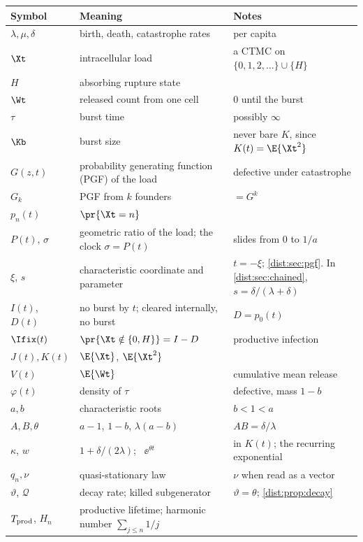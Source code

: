 \begin{table}[tbp]
\centering
\renewcommand{\arraystretch}{1.05}
\footnotesize
\begin{tabular}{@{}llp{}@{}}
\toprule
Symbol & Meaning & Notes \\
\midrule
$\lambda,\mu,\delta$ & birth, death, catastrophe rates & per capita \\
$\Xt$ & intracellular load & a CTMC on $\{0,1,2,\ldots\}\cup\{H\}$ \\
$H$ & absorbing rupture state & \\
$\Wt$ & released count from one cell & $0$ until the burst \\
$\tau$ & burst time & possibly $\infty$ \\
$\Kb$ & burst size & never bare $K$, since $K(t)=\E{\Xt^2}$ \\
$G(z,t)$ & probability generating function (PGF) of the load & defective under catastrophe \\
$G_k$ & PGF from $k$ founders & $=G^k$ \\
$p_n(t)$ & $\pr{\Xt=n}$ & \\
$P(t)$, $\sigma$ & geometric ratio of the load; the clock $\sigma=P(t)$ & slides from $0$ to $1/a$ \\
$\xi$, $s$ & characteristic coordinate and parameter & $t=-\xi$; \cref{dist:sec:pgf}. In \cref{dist:sec:chained}, $s=\delta/(\lambda+\delta)$ \\
$I(t)$, $D(t)$ & no burst by $t$; cleared internally, no burst & $D=p_0(t)$ \\
$\Ifix(t)$ & $\pr{\Xt\notin\{0,H\}}=I-D$ & productive infection \\
$J(t),K(t)$ & $\E{\Xt}$, $\E{\Xt^2}$ & \\
$V(t)$ & $\E{\Wt}$ & cumulative mean release \\
$\varphi(t)$ & density of $\tau$ & defective, mass $1-b$ \\
$a,b$ & characteristic roots & $b<1<a$ \\
$A,B,\theta$ & $a-1$, $1-b$, $\lambda(a-b)$ & $AB=\delta/\lambda$ \\
$\kappa$, $w$ & $1+\delta/(2\lambda)$; \ $\ee^{\theta t}$ & in $K(t)$; the recurring exponential \\
$q_n,\nu$ & quasi-stationary law & $\nu$ when read as a vector \\
$\vartheta$, $\mathcal Q$ & decay rate; killed subgenerator & $\vartheta=\theta$; \cref{dist:prop:decay} \\
$T_{\rm prod}$, $H_n$ & productive lifetime; harmonic number $\sum_{j\le n}1/j$ & \\

\end{tabular}
\end{table}
